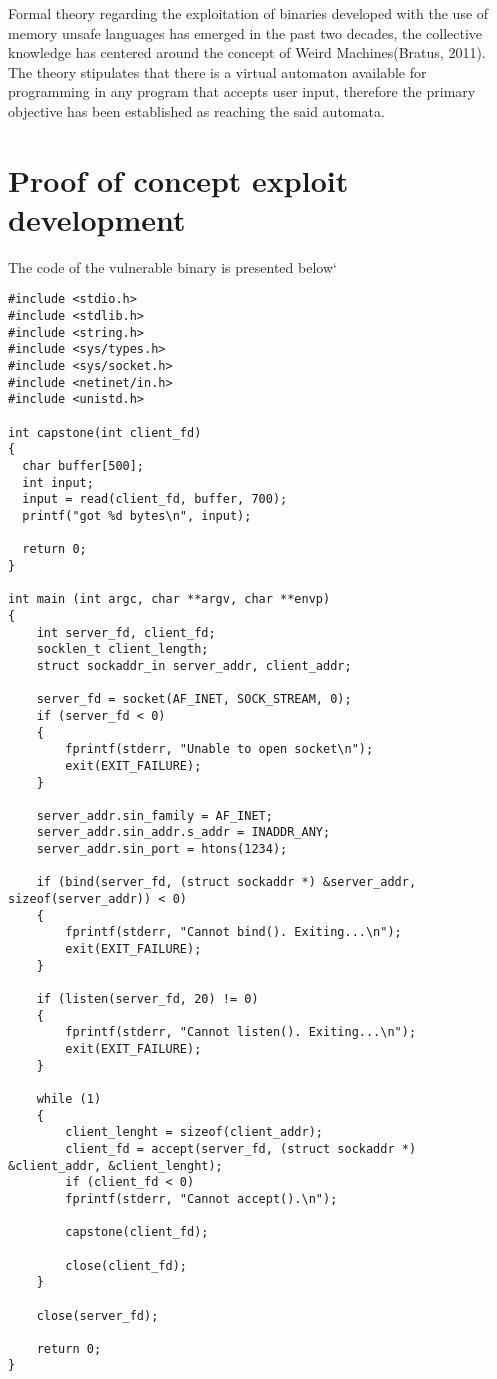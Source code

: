 \documentclass[a4paper,9pt]{report}
\begin{document}
Formal theory regarding the exploitation of binaries developed with the use of memory unsafe languages has emerged in the past two decades, the collective knowledge has centered around the concept of Weird Machines(Bratus, 2011). The theory stipulates that there is a virtual automaton available for programming in any program that accepts user input, therefore the primary objective has been established as reaching the said automata.\\


\chapter{Proof of concept exploit development}
\label{sec:org7f1647a}

The code of the vulnerable binary is presented below`\\

\begin{verbatim}
#include <stdio.h>
#include <stdlib.h>
#include <string.h>
#include <sys/types.h>
#include <sys/socket.h>
#include <netinet/in.h>
#include <unistd.h>

int capstone(int client_fd)
{
  char buffer[500];
  int input;
  input = read(client_fd, buffer, 700);
  printf("got %d bytes\n", input);

  return 0;
}

int main (int argc, char **argv, char **envp)
{
	int server_fd, client_fd;
	socklen_t client_length;
	struct sockaddr_in server_addr, client_addr;

	server_fd = socket(AF_INET, SOCK_STREAM, 0);
	if (server_fd < 0)
	{
		fprintf(stderr, "Unable to open socket\n");
		exit(EXIT_FAILURE);
	}

	server_addr.sin_family = AF_INET;
	server_addr.sin_addr.s_addr = INADDR_ANY;
	server_addr.sin_port = htons(1234);

	if (bind(server_fd, (struct sockaddr *) &server_addr, sizeof(server_addr)) < 0)
	{
		fprintf(stderr, "Cannot bind(). Exiting...\n");
		exit(EXIT_FAILURE);
	}

	if (listen(server_fd, 20) != 0)
	{
		fprintf(stderr, "Cannot listen(). Exiting...\n");
		exit(EXIT_FAILURE);
	}

	while (1)
	{
		client_lenght = sizeof(client_addr);
		client_fd = accept(server_fd, (struct sockaddr *) &client_addr, &client_lenght);
		if (client_fd < 0)
		fprintf(stderr, "Cannot accept().\n");

		capstone(client_fd);

		close(client_fd);
	}

	close(server_fd);

	return 0;
}
\end{verbatim}
\end{document}

